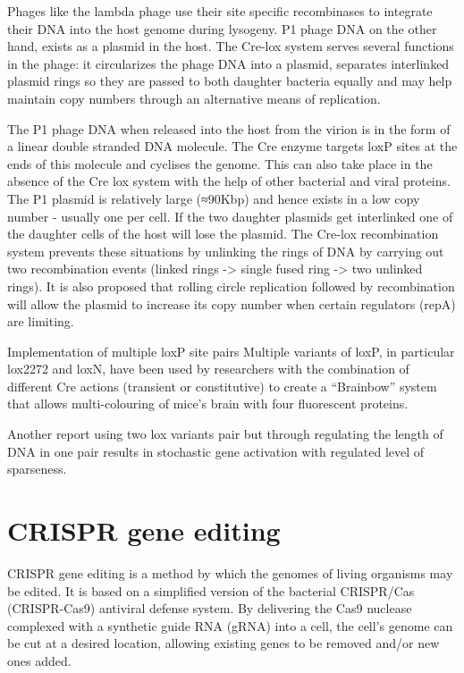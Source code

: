 Phages like the lambda phage use their site specific recombinases to integrate their DNA into the host genome during lysogeny. P1 phage DNA on the other hand, exists as a plasmid in the host. The Cre-lox system serves several functions in the phage: it circularizes the phage DNA into a plasmid, separates interlinked plasmid rings so they are passed to both daughter bacteria equally and may help maintain copy numbers through an alternative means of replication.

The P1 phage DNA when released into the host from the virion is in the form of a linear double stranded DNA molecule. The Cre enzyme targets loxP sites at the ends of this molecule and cyclises the genome. This can also take place in the absence of the Cre lox system with the help of other bacterial and viral proteins. The P1 plasmid is relatively large (≈90Kbp) and hence exists in a low copy number - usually one per cell. If the two daughter plasmids get interlinked one of the daughter cells of the host will lose the plasmid. The Cre-lox recombination system prevents these situations by unlinking the rings of DNA by carrying out two recombination events (linked rings -\textgreater{} single fused ring -\textgreater{} two unlinked rings). It is also proposed that rolling circle replication followed by recombination will allow the plasmid to increase its copy number when certain regulators (repA) are limiting.

Implementation of multiple loxP site pairs
Multiple variants of loxP, in particular lox2272 and loxN, have been used by researchers with the combination of different Cre actions (transient or constitutive) to create a ``Brainbow'' system that allows multi-colouring of mice's brain with four fluorescent proteins.

Another report using two lox variants pair but through regulating the length of DNA in one pair results in stochastic gene activation with regulated level of sparseness.

\hypertarget{crispr-gene-editing}{%
\section{CRISPR gene editing}\label{crispr-gene-editing}}

CRISPR gene editing is a method by which the genomes of living organisms may be edited. It is based on a simplified version of the bacterial CRISPR/Cas (CRISPR-Cas9) antiviral defense system. By delivering the Cas9 nuclease complexed with a synthetic guide RNA (gRNA) into a cell, the cell's genome can be cut at a desired location, allowing existing genes to be removed and/or new ones added.

